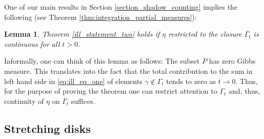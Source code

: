 \documentclass[12pt]{amsbook}%
\newtheorem{lem}[thm]{Lemma}
\theoremstyle{definition}
\theoremstyle{remark}
\numberwithin{section}{chapter}
\numberwithin{subsection}{section}
\numberwithin{figure}{chapter}
\def\dyl{>0}
\def\Ga{\Gamma}
\def\ga{\gamma}
\begin{document}
{{One of our main results in Section \ref{section_shadow_counting} implies the following (see Theorem \ref{thm:integration_partial_measures}):

\begin{lem}\label{ill_statement_three}
Theorem \ref{ill_statement_two} holds if $\eta$ restricted to the closure $\overline{\Gamma_t}$ is continuous for all $t\dyl$.
\end{lem}

Informally, one can think of this lemma as follows: The subset $P$ has zero Gibbs measure. This translates into the fact that the total contribution to the sum in left hand side in \eqref{eq:ill_eq_one} of elements $\ga\notin \Ga_t$ 
tends  to zero as $t\to 0$. Thus, for the purpose of proving the theorem one can restrict attention to $\Ga_t$ and, thus, continuity of $\eta$ on $\overline{\Gamma_t}$ suffices. 


\subsection{Stretching disks}

}}
\end{document}
